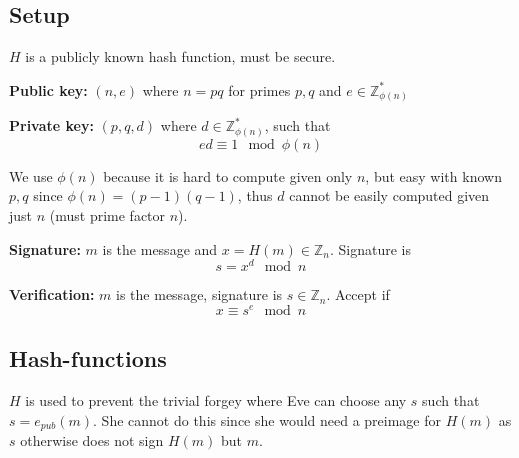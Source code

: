 

\subsection*{Setup}
$H$ is a publicly known hash function, must be secure.

\textbf{Public key:} $(n, e)$ where $n = pq$ for primes $p, q$ and $e \in \mathbb{Z}_{\phi(n)}^*$

\textbf{Private key:} $(p, q, d)$ where $d \in \mathbb{Z}_{\phi(n)}^*$, such that
\[ ed \equiv 1 \mod \phi(n) \]

We use $\phi(n)$ because it is hard to compute given only $n$, but
easy with known $p, q$ since $\phi(n) = (p-1)(q-1)$, thus $d$ cannot
be easily computed given just $n$ (must prime factor $n$).

\textbf{Signature:} $m$ is the message and $x = H(m) \in \mathbb{Z}_n$. Signature is
\[ s = x^d \mod n \]

\textbf{Verification:} $m$ is the message, signature is $s \in \mathbb{Z}_n$. Accept if
\[ x \equiv s^e \mod n \]

\subsection{Hash-functions}
$H$ is used to prevent the trivial forgey where Eve can choose any $s$
such that $s = e_{pub}(m)$. She cannot do this since she would need a
preimage for $H(m)$ as $s$ otherwise does not sign $H(m)$ but $m$.

